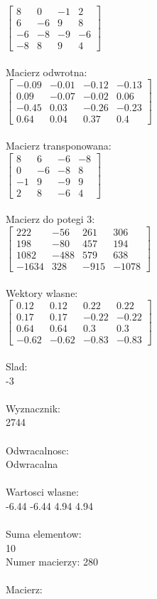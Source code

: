 \documentclass[a4paper,12pt]{article}
\begin{document}
$\begin{bmatrix} 8&0&-1&2\\6&-6&9&8\\-6&-8&-9&-6\\-8&8&9&4 \end{bmatrix}$
\\
\\
Macierz odwrotna:\\

$\begin{bmatrix} -0.09&-0.01&-0.12&-0.13\\0.09&-0.07&-0.02&0.06\\-0.45&0.03&-0.26&-0.23\\0.64&0.04&0.37&0.4 \end{bmatrix}$
\\
\\
Macierz transponowana:\\

$\begin{bmatrix} 8&6&-6&-8\\0&-6&-8&8\\-1&9&-9&9\\2&8&-6&4 \end{bmatrix}$
\\
\\
Macierz do potegi 3:\\

$\begin{bmatrix} 222&-56&261&306\\198&-80&457&194\\1082&-488&579&638\\-1634&328&-915&-1078 \end{bmatrix}$
\\
\\
Wektory wlasne:\\

$\begin{bmatrix} 0.12&0.12&0.22&0.22\\0.17&0.17&-0.22&-0.22\\0.64&0.64&0.3&0.3\\-0.62&-0.62&-0.83&-0.83 \end{bmatrix}$
\\
\\
Slad:\\
-3
\\
\\
Wyznacznik:\\
2744
\\
\\
Odwracalnosc:\\
Odwracalna
\\
\\
Wartosci wlasne:\\
-6.44 -6.44 4.94 4.94
\\
\\
Suma elementow:\\
10
\\
\newpage
Numer macierzy:
280
\\
\\
Macierz:\\
\end{document}

